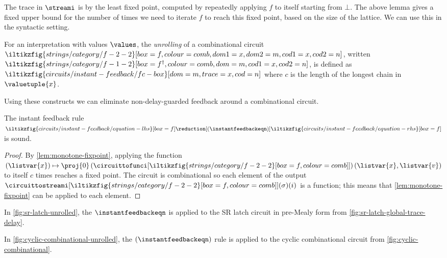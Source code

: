 \documentclass{lmcs}
\begin{document}
The trace in \(\streami\) is by the least fixed point, computed by repeatedly
applying \(f\) to itself starting from \(\bot\).
The above lemma gives a fixed upper bound for the number of times we need to
iterate \(f\) to reach this fixed point, based on the size of the lattice.
We can use this in the syntactic setting.

\begin{defi}[Unrolling]\label{def:unrolling}
    For an interpretation with values \(\values\), the \emph{unrolling}
    of a combinational circuit \(
    \iltikzfig{strings/category/f-2-2}[box=f,colour=comb,dom1=x,dom2=m,cod1=x,cod2=n]
    \), written \(
    \iltikzfig{strings/category/f-1-2}[box=f^\dagger,colour=comb,dom=m,cod1=x,cod2=n]
    \), is defined as \(
    \iltikzfig{circuits/instant-feedback/fc-box}[dom=m,trace=x,cod=n]
    \) where \(c\) is the length of the longest chain in \(\valuetuple{x}\).
\end{defi}

Using these constructs we can eliminate non-delay-guarded feedback around a
combinational circuit.

\begin{prop}\label{prop:instant-feedback}
    The instant feedback rule \(
    \iltikzfig{circuits/instant-feedback/equation-lhs}[box=f]
    \reduction[(\instantfeedbackeqn)]
    \iltikzfig{circuits/instant-feedback/equation-rhs}[box=f]
    \) is sound.
\end{prop}
\begin{proof}
    By \autoref{lem:monotone-fixpoint}, applying the function \(
    (\listvar{x}) \mapsto \proj{0}\left(\circuittofunci[
        \iltikzfig{strings/category/f-2-2}[box=f,colour=comb]
    ]\right)(\listvar{x}, \listvar{v})\) to itself \(c\) times reaches a
    fixed point.
    The circuit is combinational so each element of the output
    \(\circuittostreami[
        \iltikzfig{strings/category/f-2-2}[box=f,colour=comb]
    ](\sigma)(i)\) is a function; this means that \autoref{lem:monotone-fixpoint}
    can be applied to each element.
\end{proof}

\begin{exa}\label{ex:sr-latch-unrolled}
    In \autoref{fig:sr-latch-unrolled}, the \(\instantfeedbackeqn\) is applied to
    the SR latch circuit in pre-Mealy form from
    \autoref{fig:sr-latch-global-trace-delay}.
\end{exa}

\begin{exa}
    In \autoref{fig:cyclic-combinational-unrolled}, the \((\instantfeedbackeqn)\)
    rule is applied to the cyclic combinational circuit from
    \autoref{fig:cyclic-combinational}.
\end{exa}
\end{document}
